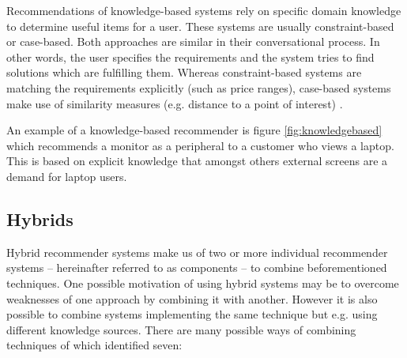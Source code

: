 Recommendations of knowledge-based systems rely on specific domain knowledge to determine useful items for a user. These systems are usually constraint-based or case-based. Both approaches are similar in their conversational process. In other words, the user specifies the requirements and the system tries to find solutions which are fulfilling them. Whereas constraint-based systems are matching the requirements explicitly (such as price ranges), case-based systems make use of similarity measures (e.g. distance to a point of interest) \cite{ricci11}.

An example of a knowledge-based recommender is figure \ref{fig:knowledgebased} which recommends a monitor as a peripheral to a customer who views a laptop. This is based on explicit knowledge that amongst others external screens are a demand for laptop users.

\subsection{Hybrids}

Hybrid recommender systems make us of two or more individual recommender systems -- hereinafter referred to as components -- to combine beforementioned techniques. One possible motivation of using hybrid systems may be to overcome weaknesses of one approach by combining it with another. However it is also possible to combine systems implementing the same technique but e.g. using different knowledge sources. There are many possible ways of combining techniques of which \citet{burke07} identified seven:

